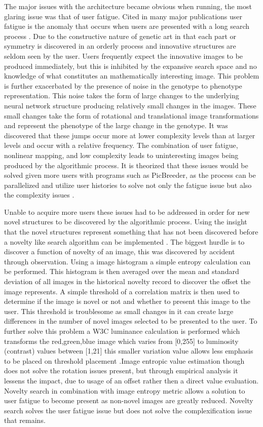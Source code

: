 The major issues with the architecture became obvious when running, the most glaring issue was that of user fatigue.
Cited in many major publications user fatigue is the anomaly that occurs when users are presented with a long search process
\cite{secretan2008picbreeder} \cite{li2009innovative}. Due to the constructive nature of genetic art in that each part or symmetry
is discovered in an orderly process and innovative structures are seldom seen by the user. Users frequently expect the innovative
images to be produced immediately, but this is inhibited by the expansive search space and no knowledge of what constitutes an 
mathematically interesting image. This problem is further exacerbated by the presence of noise in the genotype to phenotype 
representation. This noise takes the form of large changes to the underlying neural network structure producing relatively small
changes in the images. These small changes take the form of rotational and translational image transformations and represent the
phenotype of the large change in the genotype. It was discovered that these jumps occur more at lower complexity levels than at
larger levels and occur with a relative frequency. The combination of user fatigue, nonlinear mapping, and low complexity leads to
uninteresting images being produced by the algorithmic process. It is theorized that these issues would be solved given more users
with programs such as PicBreeder, as the process can be parallelized and utilize user histories to solve not only the fatigue issue
but also the complexity issues \cite{secretan2008picbreeder}.

Unable to acquire more users these issues had to be addressed in order for new novel structures to be discovered by the algorithmic
process. Using the insight that the novel structures represent something that has not been discovered before a novelty like search
algorithm can be implemented \cite{lehman2010efficiently}. The biggest hurdle is to discover a function of novelty of an image, this
was discovered by accident through observation. Using a image histogram a simple entropy calculation can be performed. This histogram
is then averaged over the mean and standard deviation of all images in the historical novelty record to discover the offset the image
represents. A simple threshold of a correlation matrix is then used to determine if the image is novel or not and whether to present this image to the user.
This threshold is troublesome as small changes in it can create large differences in the number of novel images selected to be presented
to the user. To further solve this problem a W3C luminance calculation is performed which transforms the red,green,blue image which
varies from [0,255] to luminosity (contrast) values between [1,21] this smaller variation value allows less emphasis to be placed
on threshold placement \cite{W3C}.Image entropic value estimation though does not solve the rotation issues present, but through 
empirical analysis it lessens the impact, due to usage of an offset rather then a direct value evaluation. Novelty search in combination
with image entropy metric allows a solution to user fatigue to become present as non-novel images are greatly reduced. Novelty search
solves the user fatigue issue but does not solve the complexification issue that remains. 

